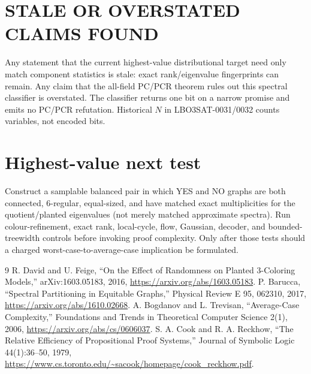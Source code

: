 \documentclass[11pt]{article}
\begin{document}
\section{STALE OR OVERSTATED CLAIMS FOUND}
Any statement that the current highest-value distributional target need only
match component statistics is stale: exact rank/eigenvalue fingerprints can
remain.  Any claim that the all-field PC/PCR theorem rules out this spectral
classifier is overstated.  The classifier returns one bit on a narrow promise
and emits no PC/PCR refutation.  Historical $N$ in LBO3SAT-0031/0032 counts
variables, not encoded bits.

\section{Highest-value next test}
Construct a samplable balanced pair in which YES and NO graphs are both
connected, 6-regular, equal-sized, and have matched exact multiplicities for
the quotient/planted eigenvalues (not merely matched approximate spectra).
Run colour-refinement, exact rank, local-cycle, flow, Gaussian, decoder, and
bounded-treewidth controls before invoking proof complexity.  Only after those
tests should a charged worst-case-to-average-case implication be formulated.

\begin{thebibliography}{9}
R. David and U. Feige,
``On the Effect of Randomness on Planted 3-Coloring Models,''
arXiv:1603.05183, 2016,
\url{https://arxiv.org/abs/1603.05183}.
P. Barucca,
``Spectral Partitioning in Equitable Graphs,''
Physical Review E 95, 062310, 2017,
\url{https://arxiv.org/abs/1610.02668}.
A. Bogdanov and L. Trevisan,
``Average-Case Complexity,''
Foundations and Trends in Theoretical Computer Science 2(1), 2006,
\url{https://arxiv.org/abs/cs/0606037}.
S. A. Cook and R. A. Reckhow,
``The Relative Efficiency of Propositional Proof Systems,''
Journal of Symbolic Logic 44(1):36--50, 1979,
\url{https://www.cs.toronto.edu/~sacook/homepage/cook_reckhow.pdf}.
\end{thebibliography}
\end{document}
